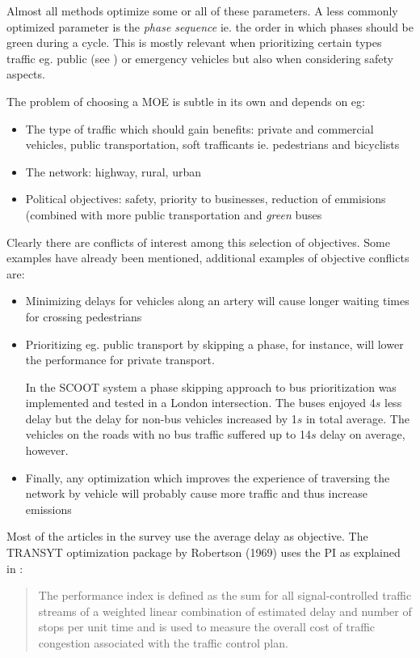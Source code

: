 Almost all methods optimize some or all of these parameters. A less commonly optimized parameter is the \textit{phase sequence} ie. the order in which phases should be green during a cycle. This is mostly relevant when prioritizing certain types traffic eg. public (see \cite{scoot2004}) or emergency vehicles but also when considering safety aspects.

The problem of choosing a MOE is subtle in its own and depends on eg:

\begin{itemize}
\item The type of traffic which should gain benefits: private and commercial vehicles, public transportation, soft trafficants ie. pedestrians and bicyclists
\item The network: highway, rural, urban
\item Political objectives: safety, priority to businesses, reduction of emmisions (combined with more public transportation and \textit{green} buses
\end{itemize}

Clearly there are conflicts of interest among this selection of objectives. Some examples have already been mentioned, additional examples of objective conflicts are:

\begin{itemize}
\item Minimizing delays for vehicles along an artery will cause longer waiting times for crossing pedestrians
\item Prioritizing eg. public transport by skipping a phase, for instance, will lower the performance for private transport. 

In the SCOOT system \cite{scoot2004} a phase skipping approach to bus prioritization was implemented and tested in a London intersection. The buses enjoyed 4$s$ less delay but the delay for non-bus vehicles increased by 1$s$ in total average. The vehicles on the roads with no bus traffic suffered up to 14$s$ delay on average, however.
\item Finally, any optimization which improves the experience of traversing the network by vehicle will probably cause more traffic and thus increase emissions
\end{itemize}

Most of the articles in the survey use the average delay as objective. The TRANSYT optimization package by Robertson (1969) uses the PI as explained in \cite{26}:

\begin{quote}
The performance index
is defined as the sum for all signal-controlled traffic streams of a
weighted linear combination of estimated delay and number
of stops per unit time and is used to measure the overall cost of
traffic congestion associated with the traffic control plan.
\end{quote}

